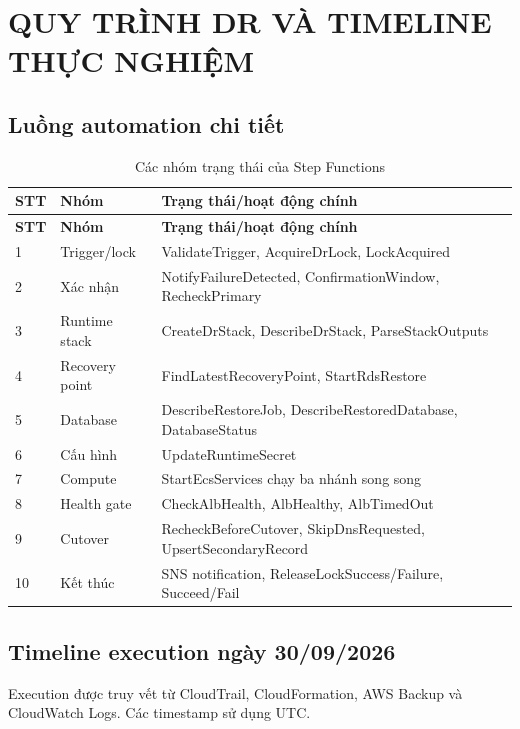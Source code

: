 \clearpage
\chapter{QUY TRÌNH DR VÀ TIMELINE THỰC NGHIỆM}

\section{Luồng automation chi tiết}

\begin{longtable}{@{}p{1cm}p{4cm}p{8.5cm}@{}}
\caption{Các nhóm trạng thái của Step Functions}\\
\toprule
\textbf{STT} & \textbf{Nhóm} & \textbf{Trạng thái/hoạt động chính}\\
\midrule
\endfirsthead
\toprule
\textbf{STT} & \textbf{Nhóm} & \textbf{Trạng thái/hoạt động chính}\\
\midrule
\endhead
1 & Trigger/lock & ValidateTrigger, AcquireDrLock, LockAcquired\\
2 & Xác nhận & NotifyFailureDetected, ConfirmationWindow, RecheckPrimary\\
3 & Runtime stack & CreateDrStack, DescribeDrStack, ParseStackOutputs\\
4 & Recovery point & FindLatestRecoveryPoint, StartRdsRestore\\
5 & Database & DescribeRestoreJob, DescribeRestoredDatabase, DatabaseStatus\\
6 & Cấu hình & UpdateRuntimeSecret\\
7 & Compute & StartEcsServices chạy ba nhánh song song\\
8 & Health gate & CheckAlbHealth, AlbHealthy, AlbTimedOut\\
9 & Cutover & RecheckBeforeCutover, SkipDnsRequested, UpsertSecondaryRecord\\
10 & Kết thúc & SNS notification, ReleaseLockSuccess/Failure, Succeed/Fail\\
\bottomrule
\end{longtable}

\section{Timeline execution ngày 30/09/2026}

Execution  được truy vết từ CloudTrail, CloudFormation, AWS Backup và CloudWatch Logs. Các timestamp sử dụng UTC.

